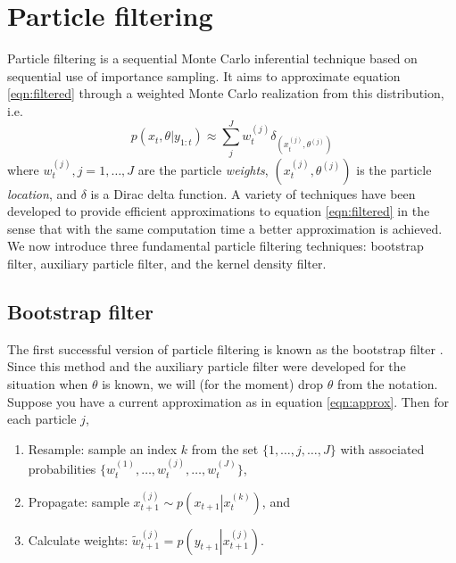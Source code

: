 \documentclass{elsarticle}
\begin{document}
\section{Particle filtering \label{sec:filtering}}

Particle filtering is a sequential Monte Carlo inferential technique based on sequential use of importance sampling. It aims to approximate equation \eqref{eqn:filtered} through a weighted Monte Carlo realization from this distribution, i.e.
\begin{equation}
p(x_t,\theta| y_{1:t}) \approx \sum_{j}^J w_t^{(j)} \delta_{(x_t^{(j)},\theta^{(j)})} \label{eqn:approx}
\end{equation}
where $w_t^{(j)},j=1,\ldots,J$ are the particle \emph{weights}, $(x_t^{(j)},\theta^{(j)})$ is the particle \emph{location}, and $\delta$ is a Dirac delta function. A variety of techniques have been developed to provide efficient approximations to equation \eqref{eqn:filtered} in the sense that with the same computation time a better approximation is achieved. We now introduce three fundamental particle filtering techniques: bootstrap filter, auxiliary particle filter, and the kernel density filter.

\subsection{Bootstrap filter}

The first successful version of particle filtering is known as the bootstrap filter \citep{Gord:Salm:Smit:nove:1993}. Since this method and the auxiliary particle filter were developed for the situation when $\theta$ is known, we will (for the moment) drop $\theta$ from the notation. Suppose you have a current approximation as in equation \eqref{eqn:approx}. Then for each particle $j$,

\begin{enumerate}
\item Resample: sample an index $k$ from the set $\{1,\ldots,j,\ldots,J\}$ with associated probabilities $\{w_t^{(1)},\ldots,w_t^{(j)},\ldots,w_t^{(J)}\}$,
\item Propagate: sample $x_{t+1}^{(j)} \sim p\left(\left. x_{t+1}\right|x_t^{(k)}\right)$, and
\item Calculate weights: $\tilde{w}_{t+1}^{(j)} = p\left(y_{t+1}\left|x_{t+1}^{(j)}\right.\right)$.
\end{enumerate}
\end{document}
